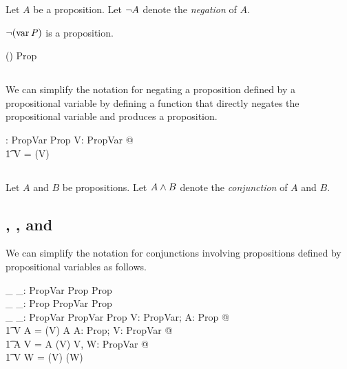 \documentclass[11pt, oneside]{article}
\begin{document}
Let $A$ be a proposition.
Let $\lnot A$ denote the {\it negation} of $A$.

\begin{example}
$\lnot(\operatorname{var} \mathit{P})$ is a proposition.

\begin{zed}
	\notProp(\varProp \propP) \in Prop
\end{zed}

\end{example}

\subsection{}

We can simplify the notation for negating a proposition defined by a propositional variable 
by defining a function that directly negates the propositional variable and produces a proposition.

\begin{axdef}
	\notPropV: PropVar \inj Prop
\where
	\forall V: PropVar @ \\
	\t1	\notPropV V = \notProp(\varProp V)
\end{axdef}

\subsection{}

Let $A$ and $B$ be propositions.
Let $A \mathbin{\land} B$ denote the {\it conjunction} of $A$ and $B$.

\subsection{, , and }

We can simplify the notation for conjunctions involving propositions defined by propositional variables as follows.

\begin{axdef}
	\_ \andPropVP \_: PropVar \cross Prop \inj Prop \\
	\_ \andPropPV \_: Prop \cross PropVar \inj Prop \\
	\_ \andPropVV \_: PropVar \cross PropVar \inj Prop
\where
	\forall V: PropVar; A: Prop @ \\
	\t1	V \andPropVP A = (\varProp V) \andProp A
\also
	\forall A: Prop; V: PropVar @ \\
	\t1	A \andPropPV V = A \andProp (\varProp V)
\also
	\forall V, W: PropVar @ \\
	\t1	V \andPropVV W = (\varProp V) \andProp (\varProp W)
\end{axdef}
\end{document}
